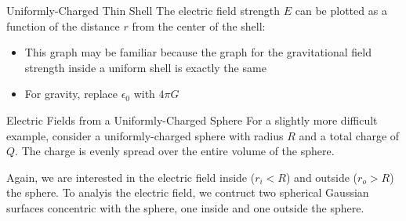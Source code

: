 \documentclass[12pt,aspectratio=169]{beamer}
\begin{document}
\begin{frame}{Uniformly-Charged Thin Shell}
  The electric field strength $E$ can be plotted as a function of the distance
  $r$ from the center of the shell:
  \begin{center}
  \end{center}
  \begin{itemize}
  \item This graph may be familiar because the graph for the gravitational field
    strength inside a uniform shell is exactly the same
  \item For gravity, replace $\epsilon_0$ with $4\pi G$
  \end{itemize}
\end{frame}



\begin{frame}{Electric Fields from a Uniformly-Charged Sphere}
  For a slightly more difficult example, consider a uniformly-charged sphere
  with radius $R$ and a total charge of $Q$.
  The charge is evenly spread over the
  entire volume of the sphere.
  \begin{center}
  \end{center}
  Again, we are interested in the electric field inside ($r_i<R$) and outside
  ($r_o>R$) the sphere. To analyis the electric field, we contruct two spherical
  Gaussian surfaces concentric with the sphere, one inside and one outside the
  sphere.
\end{frame}
\end{document}
